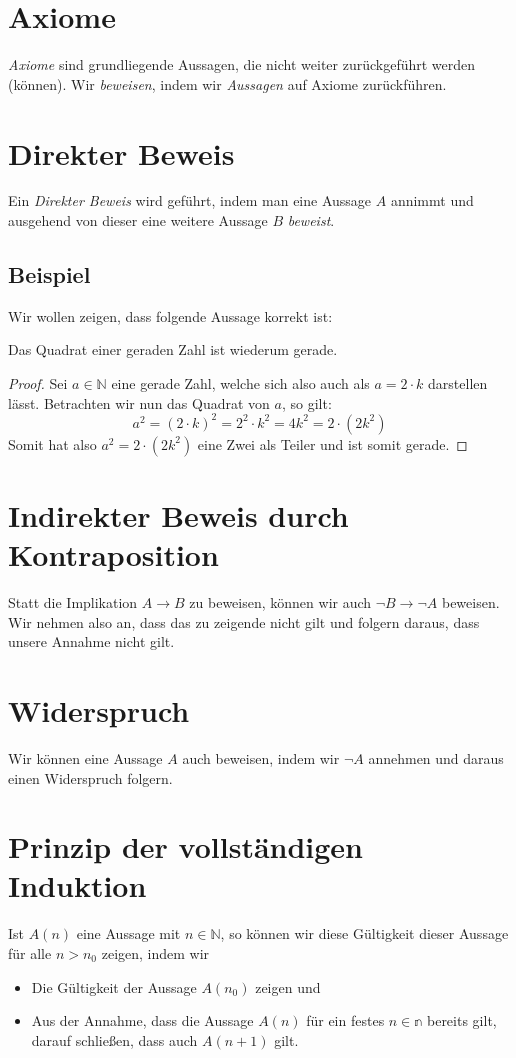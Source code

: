 \documentclass{scrreprt}[twoside=true]
\begin{document}
		\section{Axiome}
		\emph{Axiome} sind grundliegende Aussagen, die nicht weiter zurückgeführt werden (können). Wir \emph{beweisen}, indem wir \emph{Aussagen} auf Axiome zurückführen.

		\section{Direkter Beweis}
		Ein \emph{Direkter Beweis} wird geführt, indem man eine Aussage $A$ annimmt und ausgehend von dieser eine weitere Aussage $B$ \emph{beweist}.

		\subsection{Beispiel}
		Wir wollen zeigen, dass folgende Aussage korrekt ist:
		\begin{center}
			Das Quadrat einer geraden Zahl ist wiederum gerade.
		\end{center}
		\begin{proof}
			Sei $a \in \mathbb{N}$ eine gerade Zahl, welche sich also auch als $a = 2 \cdot k$ darstellen lässt. Betrachten wir nun das Quadrat von $a$, so gilt:
			\begin{equation*}
				a^2 = (2 \cdot k)^2 = 2^2 \cdot k^2 = 4 k^2 = 2 \cdot (2 k^2)
			\end{equation*}
			Somit hat also $a^2 = 2 \cdot (2 k^2)$ eine Zwei als Teiler und ist somit gerade.\square
		\end{proof}

		\section{Indirekter Beweis durch Kontraposition}
		Statt die Implikation $A \rightarrow B$ zu beweisen, können wir auch $\neg B \rightarrow \neg A$ beweisen. Wir nehmen also an, dass das zu zeigende nicht gilt und folgern daraus, dass unsere Annahme nicht gilt.

		\section{Widerspruch}
		Wir können eine Aussage $A$ auch beweisen, indem wir $\neg A$ annehmen und daraus einen Widerspruch folgern.

		\section{Prinzip der vollständigen Induktion}
		Ist $A(n)$ eine Aussage mit $n \in \mathbb{N}$, so können wir diese Gültigkeit dieser Aussage für alle $n > n_0$ zeigen, indem wir
		\begin{itemize}
			\item
				Die Gültigkeit der Aussage $A(n_0)$ zeigen und
			\item
				Aus der Annahme, dass die Aussage $A(n)$ für ein festes $n \in \mathbb{n}$ bereits gilt, darauf schließen, dass auch $A(n + 1)$ gilt.
		\end{itemize}
\end{document}

